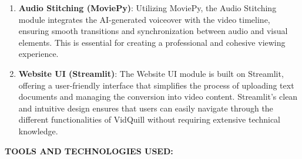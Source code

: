\documentclass[12pt]{article}
\begin{document}
\begin{enumerate}
    \item \textbf{Audio Stitching (MoviePy)}: Utilizing MoviePy, the Audio Stitching module integrates the AI-generated voiceover with the video timeline, ensuring smooth transitions and synchronization between audio and visual elements. This is essential for creating a professional and cohesive viewing experience.
    
    \item \textbf{Website UI (Streamlit)}: The Website UI module is built on Streamlit, offering a user-friendly interface that simplifies the process of uploading text documents and managing the conversion into video content. Streamlit’s clean and intuitive design ensures that users can easily navigate through the different functionalities of VidQuill without requiring extensive technical knowledge.
\end{enumerate}
\bigskip

\justify \textbf{\fontsize{12}{12} TOOLS AND TECHNOLOGIES USED: }
\end{document}
